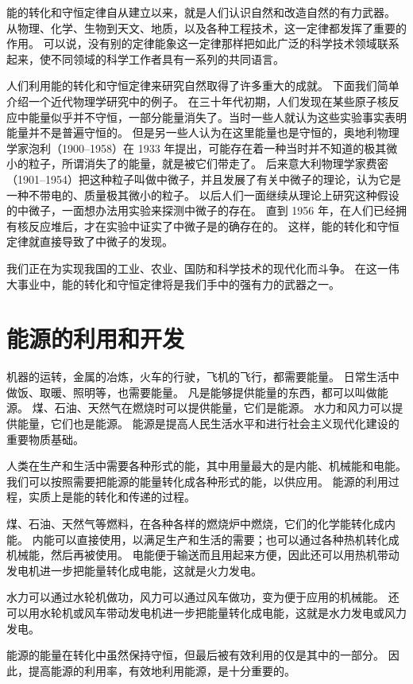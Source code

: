 能的转化和守恒定律自从建立以来，就是人们认识自然和改造自然的有力武器。
从物理、化学、生物到天文、地质，以及各种工程技术，这一定律都发挥了重要的作用。
可以说，没有别的定律能象这一定律那样把如此广泛的科学技术领域联系起来，使不同领域的科学工作者具有一系列的共同语言。

人们利用能的转化和守恒定律来研究自然取得了许多重大的成就。
下面我们简单介绍一个近代物理学研究中的例子。
在三十年代初期，人们发现在某些原子核反应中能量似乎并不守恒，一部分能量消失了。当时一些人就认为这些实验事实表明能量并不是普遍守恒的。
但是另一些人认为在这里能量也是守恒的，奥地利物理学家泡利（1900--1958）在 1933 年提出，可能存在着一种当时并不知道的极其微小的粒子，所谓消失了的能量，就是被它们带走了。
后来意大利物理学家费密（1901--1954）把这种粒子叫做中微子，并且发展了有关中微子的理论，认为它是一种不带电的、质量极其微小的粒子。
以后人们一面继续从理论上研究这种假设的中微子，一面想办法用实验来探测中微子的存在。
直到 1956 年，在人们已经拥有核反应堆后，才在实验中证实了中微子是的确存在的。
这样，能的转化和守恒定律就直接导致了中微子的发现。

我们正在为实现我国的工业、农业、国防和科学技术的现代化而斗争。
在这一伟大事业中，能的转化和守恒定律将是我们手中的强有力的武器之一。

\section{能源的利用和开发}
机器的运转，金属的冶炼，火车的行驶，飞机的飞行，都需要能量。
日常生活中做饭、取暖、照明等，也需要能量。
凡是能够提供能量的东西，都可以叫做能源。
煤、石油、天然气在燃烧时可以提供能量，它们是能源。
水力和风力可以提供能量，它们也是能源。
能源是提高人民生活水平和进行社会主义现代化建设的重要物质基础。

人类在生产和生活中需要各种形式的能，其中用量最大的是内能、机械能和电能。
我们可以按照需要把能源的能量转化成各种形式的能，以供应用。
能源的利用过程，实质上是能的转化和传递的过程。

煤、石油、天然气等燃料，在各种各样的燃烧炉中燃烧，它们的化学能转化成内能。
内能可以直接使用，以满足生产和生活的需要；也可以通过各种热机转化成机械能，然后再被使用。
电能便于输送而且用起来方便，因此还可以用热机带动发电机进一步把能量转化成电能，这就是火力发电。

水力可以通过水轮机做功，风力可以通过风车做功，变为便于应用的机械能。
还可以用水轮机或风车带动发电机进一步把能量转化成电能，这就是水力发电或风力发电。

能源的能量在转化中虽然保持守恒，但最后被有效利用的仅是其中的一部分。
因此，提高能源的利用率，有效地利用能源，是十分重要的。

